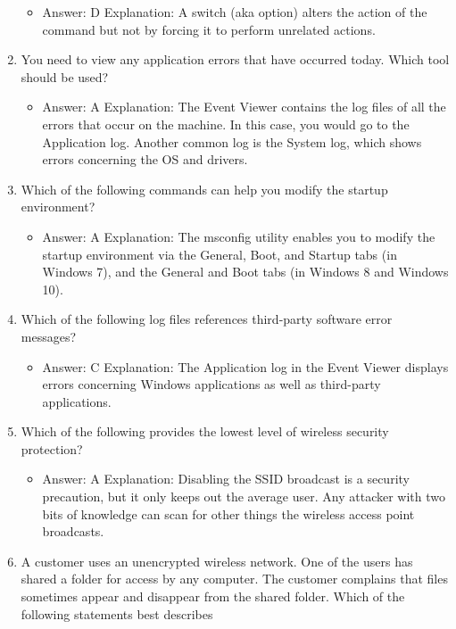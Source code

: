 \documentclass{article}
\begin{document}
\begin{enumerate}
    \begin{itemize}
        \item Answer: D
Explanation: A switch (aka option) alters the action of the command but not by forcing
it to perform unrelated actions.
    \end{itemize}
    \item You need to view any application errors that have occurred today.
Which tool should be used?
    \begin{itemize}
        \item Answer: A
Explanation: The Event Viewer contains the log files of all the errors that occur on the
machine. In this case, you would go to the Application log. Another common log is the
System log, which shows errors concerning the OS and drivers.
    \end{itemize}
    \item Which of the following commands can help you modify the startup
environment?
    \begin{itemize}
        \item Answer: A
Explanation: The msconfig utility enables you to modify the startup environment via
the General, Boot, and Startup tabs (in Windows 7), and the General and Boot tabs (in
Windows 8 and Windows 10).
    \end{itemize}
    \item Which of the following log files references third-party software
error messages?
    \begin{itemize}
        \item Answer: C
Explanation: The Application log in the Event Viewer displays errors concerning
Windows applications as well as third-party applications.
    \end{itemize}
    \item Which of the following provides the lowest level of wireless security
protection?
    \begin{itemize}
        \item Answer: A
Explanation: Disabling the SSID broadcast is a security precaution, but it only keeps
out the average user. Any attacker with two bits of knowledge can scan for other things
the wireless access point broadcasts.
    \end{itemize}
    \item A customer uses an unencrypted wireless network. One of the
users has shared a folder for access by any computer. The customer
complains that files sometimes appear and disappear from
the shared folder. Which of the following statements best describes

\end{enumerate}
\end{document}
